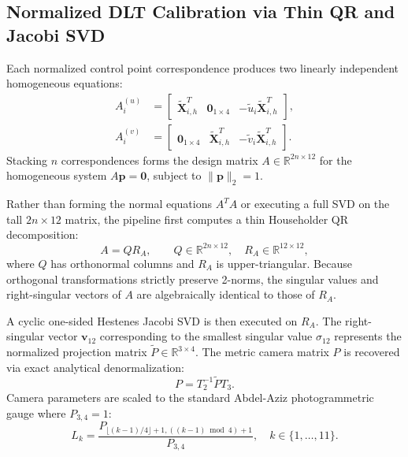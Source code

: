 \documentclass[a4paper,conference]{IEEEtran}
\newcommand{\R}{\mathbb{R}}
\newcommand{\X}{\mathbf{X}}
\begin{document}
\subsection{Normalized DLT Calibration via Thin QR and Jacobi SVD}
Each normalized control point correspondence produces two linearly independent homogeneous equations:
\begin{align}
A_i^{(u)} &= \begin{bmatrix} \tilde{\X}_{i,h}^T & \mathbf{0}_{1 \times 4} & -\tilde{u}_i \tilde{\X}_{i,h}^T \end{bmatrix}, \\
A_i^{(v)} &= \begin{bmatrix} \mathbf{0}_{1 \times 4} & \tilde{\X}_{i,h}^T & -\tilde{v}_i \tilde{\X}_{i,h}^T \end{bmatrix}.
\label{eq:dltrows}
\end{align}
Stacking $n$ correspondences forms the design matrix $A \in \R^{2n \times 12}$ for the homogeneous system $A \mathbf{p} = \mathbf{0}$, subject to $\|\mathbf{p}\|_2 = 1$.

Rather than forming the normal equations $A^T A$ or executing a full SVD on the tall $2n \times 12$ matrix, the pipeline first computes a thin Householder QR decomposition:
\begin{equation}
A = Q R_A, \qquad Q \in \R^{2n \times 12}, \quad R_A \in \R^{12 \times 12},
\label{eq:qrA}
\end{equation}
where $Q$ has orthonormal columns and $R_A$ is upper-triangular. Because orthogonal transformations strictly preserve 2-norms, the singular values and right-singular vectors of $A$ are algebraically identical to those of $R_A$.

A cyclic one-sided Hestenes Jacobi SVD is then executed on $R_A$. The right-singular vector $\mathbf{v}_{12}$ corresponding to the smallest singular value $\sigma_{12}$ represents the normalized projection matrix $\tilde{P} \in \R^{3 \times 4}$. The metric camera matrix $P$ is recovered via exact analytical denormalization:
\begin{equation}
P = T_2^{-1} \tilde{P} T_3.
\label{eq:denorm}
\end{equation}
Camera parameters are scaled to the standard Abdel-Aziz photogrammetric gauge where $P_{3,4} = 1$:
\begin{equation}
L_k = \frac{P_{\lfloor(k-1)/4\rfloor+1, ((k-1)\!\bmod 4)+1}}{P_{3,4}}, \quad k \in \{1, \dots, 11\}.
\end{equation}
\end{document}
